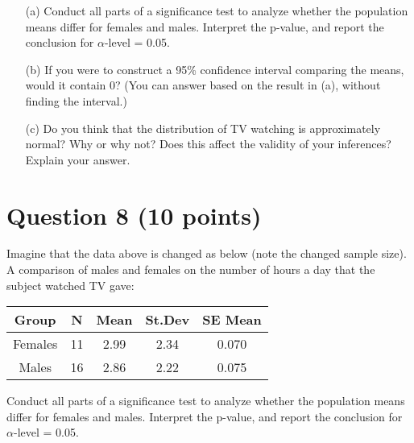 \documentclass[12pt,letterpaper]{article}
\begin{document}
\begin{itemize}
	
	\item[(a)] Conduct all parts of a significance test to analyze whether the population means differ for females and males. Interpret the p-value, and report the conclusion for $\alpha$-level = 0.05. \\
	
	\vspace{4cm}
	
	
	\item[(b)] If you were to construct a 95\% confidence interval comparing the means, would it contain 0? (You can answer based on the result in (a), without finding the interval.) \\
	
	\vspace{4cm}
	
	
	\item[(c)] Do you think that the distribution of TV watching is approximately normal? Why or why not? Does this affect the validity of your inferences? Explain your answer. \\
	
	
\end{itemize}


		\vspace{7em}
\section*{Question 8 (10 points)}
Imagine that the data above is changed as below (note the changed sample size). A comparison of males and females on the number of hours a day that the subject watched TV gave:
\begin{table}[H]
	\centering
	\begin{tabular}{c|cccc}
		Group  & N & Mean & St.Dev & SE Mean \\ 
		\hline \rule[-2ex]{0pt}{5.5ex}
		Females & 11  & 2.99 & 2.34 & 0.070  \\ 
		Males &  16 & 2.86 & 2.22 & 0.075 \\ 
		\hline 
	\end{tabular} 
\end{table}

\vspace{2em}
\noindent Conduct all parts of a significance test to analyze whether the population means differ for females and males. Interpret the p-value, and report the conclusion for $\alpha$-level = 0.05.\\
	
\end{document}
